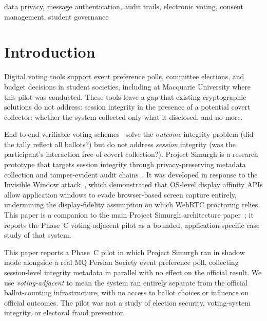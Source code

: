 \documentclass[conference]{IEEEtran}
\newcommand{\sys}{Project Simurgh}
\begin{document}
\begin{IEEEkeywords}
data privacy, message authentication, audit trails, electronic voting,
consent management, student governance
\end{IEEEkeywords}

\section{Introduction}

Digital voting tools support event preference polls, committee elections, and
budget decisions in student societies, including at Macquarie University where
this pilot was conducted. These tools leave a gap that existing cryptographic
solutions do not address: session integrity in the presence of a potential
covert collector: whether the system collected only what it disclosed, and
no more.

End-to-end verifiable voting schemes~\cite{adida2008helios,clarkson2008civitas}
solve the \emph{outcome} integrity problem (did the tally reflect all ballots?)
but do not address \emph{session} integrity (was the participant's interaction
free of covert collection?). \sys{} is a research prototype that targets session
integrity through privacy-preserving metadata collection and tamper-evident
audit chains~\cite{simurgh2026}. It was developed in response to the Invisible
Window attack~\cite{abedini2026invisible}, which demonstrated that OS-level
display affinity APIs allow application windows to evade browser-based screen
capture entirely, undermining the display-fidelity assumption on which WebRTC
proctoring relies. This paper is a companion to the main \sys{} architecture
paper~\cite{simurgh2026}; it reports the Phase~C voting-adjacent pilot as a
bounded, application-specific case study of that system.

This paper reports a Phase~C pilot in which \sys{} ran in shadow mode alongside
a real MQ Persian Society event preference poll, collecting session-level
integrity metadata in parallel with no effect on the official result. We use
\emph{voting-adjacent} to mean the system ran entirely separate from the
official ballot-counting infrastructure, with no access to ballot choices or
influence on official outcomes. The pilot was not a study of election security,
voting-system integrity, or electoral fraud prevention.
\end{document}

